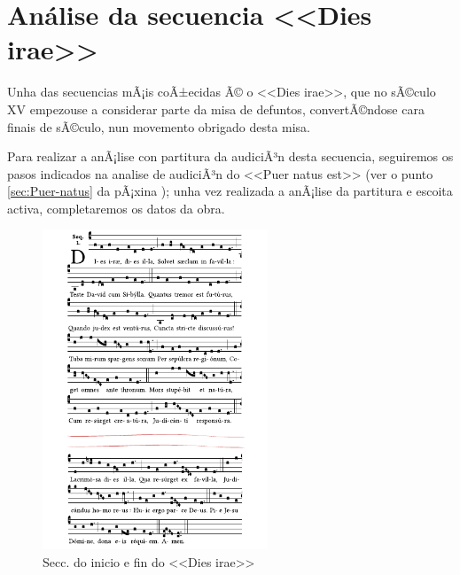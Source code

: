 %
%
\section{Análise da secuencia <<Dies irae>>} \label{Intro}
%
Unha das secuencias mÃ¡is coÃ±ecidas Ã© o <<Dies irae>>, que no sÃ©culo XV empezouse a considerar parte da misa de defuntos, convertÃ©ndose cara finais de sÃ©culo, nun movemento obrigado desta misa.

Para realizar a anÃ¡lise con partitura da audiciÃ³n desta secuencia, seguiremos os pasos indicados na analise de audiciÃ³n do <<Puer natus est>>  (ver o punto \ref{sec:Puer-natus} da pÃ¡xina \pageref{sec:Puer-natus}); unha vez realizada a anÃ¡lise da partitura e escoita activa, completaremos os datos da obra.
\par
\vspace*{0.15cm}
%
\begin{figure}[h]
    \centering
    \includegraphics[width=0.60\textwidth]{figures/ud-03/dies-irae-solesmes-cut.pdf}
    \caption{Secc. do inicio e fin do <<Dies irae>>}
    \label{fig:dies-irae}
\end{figure}
%
%

